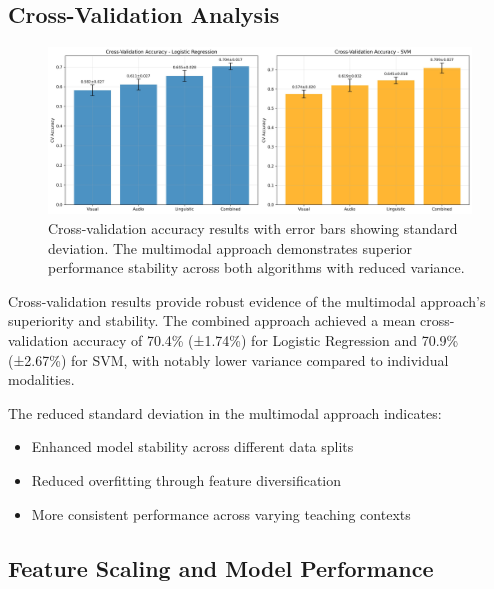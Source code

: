 \subsection{Cross-Validation Analysis}

\begin{figure}[H]
    \centering
    \includegraphics[width=\textwidth]{sections/cross_validation_comparison.jpg}
    \caption{Cross-validation accuracy results with error bars showing standard deviation. The multimodal approach demonstrates superior performance stability across both algorithms with reduced variance.}
    \label{fig:cross_validation}
\end{figure}

Cross-validation results provide robust evidence of the multimodal approach's superiority and stability. The combined approach achieved a mean cross-validation accuracy of 70.4\% (±1.74\%) for Logistic Regression and 70.9\% (±2.67\%) for SVM, with notably lower variance compared to individual modalities.

The reduced standard deviation in the multimodal approach indicates:
\begin{itemize}
    \item Enhanced model stability across different data splits
    \item Reduced overfitting through feature diversification
    \item More consistent performance across varying teaching contexts
\end{itemize}

\subsection{Feature Scaling and Model Performance}

